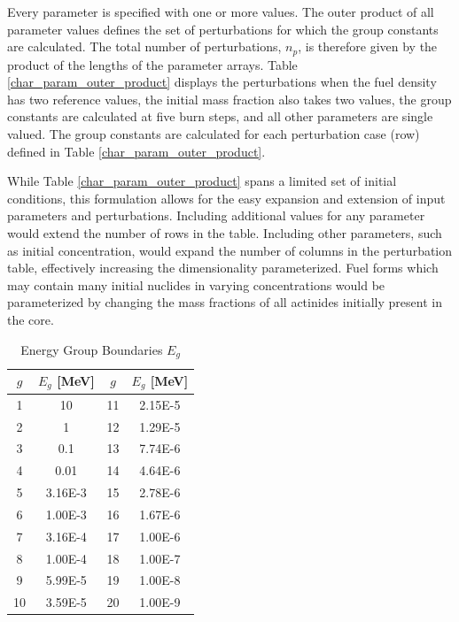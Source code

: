 Every parameter is specified with one or more values.  The outer product of all parameter
values defines the set of perturbations for which the group constants are calculated.
The total number of perturbations, $n_p$, is therefore given by the product of 
the lengths of the parameter arrays.  Table \ref{char_param_outer_product} 
displays the perturbations when the fuel density has two reference values, the initial  mass 
fraction also takes two values, the group constants are calculated at five burn steps, and all 
other parameters are single valued.  The group constants are calculated for each perturbation
case (row) defined in Table \ref{char_param_outer_product}.

While Table \ref{char_param_outer_product} spans a limited set of initial conditions, this formulation 
allows for the easy expansion and extension of input parameters and perturbations. 
Including additional values for any parameter would extend the number of rows in the table.  
Including other parameters, such as initial  concentration, would expand the number of
columns in the perturbation table, effectively increasing the dimensionality parameterized.
Fuel forms which may contain many initial nuclides in varying concentrations would be parameterized 
by changing the mass fractions of all actinides initially present in the core.  

\begin{table}[htbp]
\begin{center}
\caption{Energy Group Boundaries $E_g$}
\label{group_boundaries}
\begin{tabular}{|c|c||c|c|}
\hline
\textbf{$g$} & \textbf{$E_g$ [MeV]} & \textbf{$g$} & \textbf{$E_g$ [MeV]} \\
\hline
1  & 10      & 11 & 2.15E-5 \\ 
2  & 1       & 12 & 1.29E-5 \\ 
3  & 0.1     & 13 & 7.74E-6 \\
4  & 0.01    & 14 & 4.64E-6 \\
5  & 3.16E-3 & 15 & 2.78E-6 \\
6  & 1.00E-3 & 16 & 1.67E-6 \\
7  & 3.16E-4 & 17 & 1.00E-6 \\
8  & 1.00E-4 & 18 & 1.00E-7 \\
9  & 5.99E-5 & 19 & 1.00E-8 \\
10 & 3.59E-5 & 20 & 1.00E-9 \\
\hline
\end{tabular}
\end{center}
\end{table}

